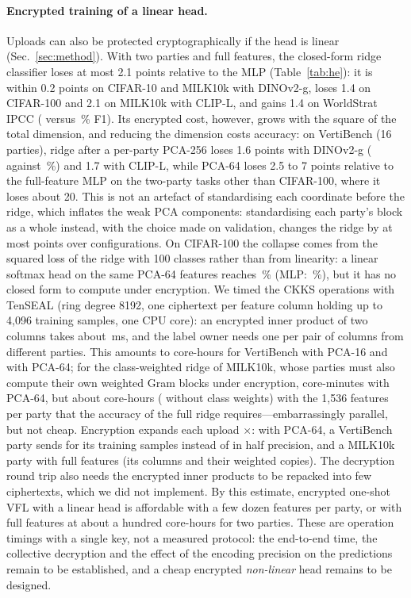 \paragraph{Encrypted training of a linear head.}
Uploads can also be protected cryptographically if the head is linear (Sec.~\ref{sec:method}). With two parties and full features, the closed-form ridge classifier loses at most 2.1 points relative to the MLP (Table~\ref{tab:he}): it is within 0.2 points on CIFAR-10 and MILK10k with DINOv2-g, loses 1.4 on CIFAR-100 and 2.1 on MILK10k with CLIP-L, and gains 1.4 on WorldStrat IPCC (\heworldstratipccRidgeFull{} versus \heworldstratipccMlp\,\% F1). Its encrypted cost, however, grows with the square of the total dimension, and reducing the dimension costs accuracy: on VertiBench (16 parties), ridge after a per-party PCA-256 loses 1.6 points with DINOv2-g (\heVbGRidgeTf{} against \heVbGMlp\,\%) and 1.7 with CLIP-L, while PCA-64 loses 2.5 to 7 points relative to the full-feature MLP on the two-party tasks other than CIFAR-100, where it loses about 20. This is not an artefact of standardising each coordinate before the ridge, which inflates the weak PCA components: standardising each party's block as a whole instead, with the choice made on validation, changes the ridge by at most \heSelMax{} points over \heSelN{} configurations. On CIFAR-100 the collapse comes from the squared loss of the ridge with 100 classes rather than from linearity: a linear softmax head on the same PCA-64 features reaches \heCHundredSfLin\,\% (MLP: \heCHundredSfMlp\,\%), but it has no closed form to compute under encryption. We timed the CKKS operations with TenSEAL (ring degree 8192, one ciphertext per feature column holding up to 4{,}096 training samples, one CPU core): an encrypted inner product of two columns takes about \hcVbStCtCt\,ms, and the label owner needs one per pair of columns from different parties. This amounts to \hcVbStServerH{} core-hours for VertiBench with PCA-16 and \hcVbSfServerH{} with PCA-64; for the class-weighted ridge of MILK10k, whose parties must also compute their own weighted Gram blocks under encryption, \hcMilkServer{} core-minutes with PCA-64, but about \hcMilkFullH{} core-hours (\hcMilkFullUnwH{} without class weights) with the 1{,}536 features per party that the accuracy of the full ridge requires---embarrassingly parallel, but not cheap. Encryption expands each upload $\times$\hcVbSfExpand: with PCA-64, a VertiBench party sends \hcVbSfUp{} for its \hcVbSfN{} training samples instead of \hcVbSfPlain{} in half precision, and a MILK10k party with full features \hcMilkFullUp{} (its columns and their weighted copies). The decryption round trip also needs the encrypted inner products to be repacked into few ciphertexts, which we did not implement. By this estimate, encrypted one-shot VFL with a linear head is affordable with a few dozen features per party, or with full features at about a hundred core-hours for two parties. These are operation timings with a single key, not a measured protocol: the end-to-end time, the collective decryption and the effect of the encoding precision on the predictions remain to be established, and a cheap encrypted \emph{non-linear} head remains to be designed.

